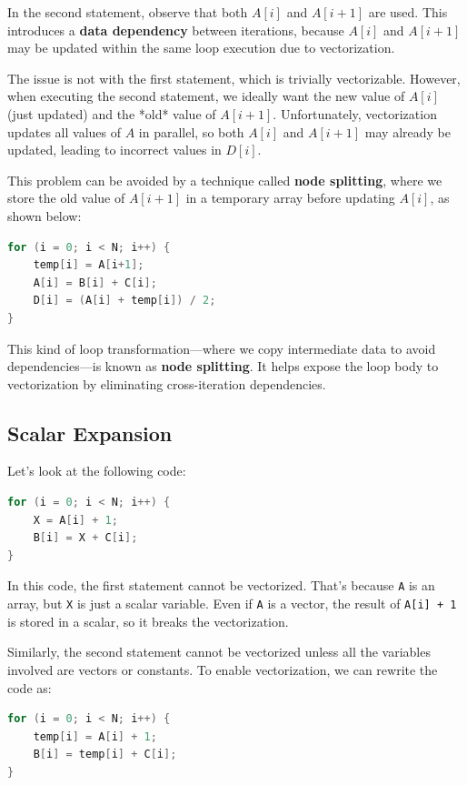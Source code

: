 \documentclass[12pt]{book}
\begin{document}
In the second statement, observe that both \( A[i] \) and \( A[i+1] \) are used. This introduces a \textbf{data dependency} between iterations, because \( A[i] \) and \( A[i+1] \) may be updated within the same loop execution due to vectorization. 

The issue is not with the first statement, which is trivially vectorizable. However, when executing the second statement, we ideally want the new value of \( A[i] \) (just updated) and the *old* value of \( A[i+1] \). Unfortunately, vectorization updates all values of \( A \) in parallel, so both \( A[i] \) and \( A[i+1] \) may already be updated, leading to incorrect values in \( D[i] \).

This problem can be avoided by a technique called \textbf{node splitting}, where we store the old value of \( A[i+1] \) in a temporary array before updating \( A[i] \), as shown below:

\begin{lstlisting}[language=C]
for (i = 0; i < N; i++) {
    temp[i] = A[i+1];
    A[i] = B[i] + C[i];
    D[i] = (A[i] + temp[i]) / 2;
}
\end{lstlisting}

This kind of loop transformation—where we copy intermediate data to avoid dependencies—is known as \textbf{node splitting}. It helps expose the loop body to vectorization by eliminating cross-iteration dependencies.

\subsection{Scalar Expansion}
Let’s look at the following code:
\begin{lstlisting}[language=C++]
for (i = 0; i < N; i++) {
    X = A[i] + 1;
    B[i] = X + C[i];
}
\end{lstlisting}

In this code, the first statement cannot be vectorized. That’s because \texttt{A} is an array, but \texttt{X} is just a scalar variable. Even if \texttt{A} is a vector, the result of \texttt{A[i] + 1} is stored in a scalar, so it breaks the vectorization.

Similarly, the second statement cannot be vectorized unless all the variables involved are vectors or constants. To enable vectorization, we can rewrite the code as:

\begin{lstlisting}[language=C++]
for (i = 0; i < N; i++) {
    temp[i] = A[i] + 1;
    B[i] = temp[i] + C[i];
}
\end{lstlisting}
\end{document}
